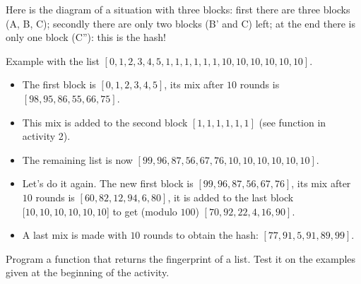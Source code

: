 \documentclass[11pt,class=report,crop=false]{standalone}
\begin{document}
\begin{activite}
\begin{enumerate}
 
Here is the diagram of a situation with three blocks: first there are three blocks (A, B, C); secondly there are only two blocks (B' and C) left; at the end there is only one block (C''): this is the hash!
  
  
  Example with the list $[0,1,2,3,4,5,1,1,1,1,1,1,10,10,10,10,10,10]$.
  \begin{itemize}
    \item The first block is $[0,1,2,3,4,5]$, its mix after $10$ rounds is    $[98, 95, 86, 55, 66, 75]$. 
    \item This mix is added to the second block $[1,1,1,1,1,1]$ (see function  in activity 2).
    \item The remaining list is now $[99,96,87,56,67,76,10,10,10,10,10,10]$.
    \item Let's do it again. The new first block is $[99,96,87,56,67,76]$, its mix after $10$ rounds is $[60, 82, 12, 94, 6, 80]$, it is added to the last block $[10,10,10,10,10,10$] to get (modulo $100$) $[70,92,22,4,16,90]$.
    \item A last mix is made with $10$ rounds to obtain the hash: $[77, 91, 5, 91, 89, 99]$.
   \end{itemize}
   
   Program a  function that returns the fingerprint of a list. Test it on the examples given at the beginning of the activity.
\end{enumerate}   
     
\end{activite}



\end{document}
